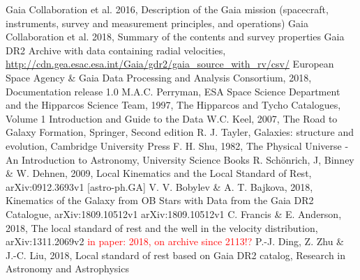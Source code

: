 \documentclass{aastex62}
\begin{document}
	\begin{thebibliography}{}
		
		 Gaia Collaboration et al. 2016, Description of the Gaia mission (spacecraft, instruments, survey and measurement principles, and operations)
		Gaia Collaboration et al. 2018, Summary of the contents and survey properties
		 Gaia DR2 Archive with data containing radial velocities, \url{http://cdn.gea.esac.esa.int/Gaia/gdr2/gaia_source_with_rv/csv/}
		 European Space Agency \& Gaia Data Processing and Analysis Consortium, 2018, Documentation release 1.0
		 M.A.C. Perryman, ESA Space Science Department and the Hipparcos Science Team, 1997, The Hipparcos and Tycho Catalogues, Volume 1 Introduction and Guide to the Data
		W.C. Keel, 2007, The Road to Galaxy Formation, Springer, Second edition
		 R. J. Tayler, Galaxies: structure and evolution, Cambridge University Press
		 F. H. Shu, 1982, The Physical Universe - An Introduction to Astronomy, University Science Books
		 R. Sch\"{o}nrich, J, Binney \& W. Dehnen, 2009, Local Kinematics and the Local Standard of Rest, arXiv:0912.3693v1 [astro-ph.GA]
		 V. V. Bobylev \& A. T. Bajkova, 2018, Kinematics of the Galaxy from OB Stars with Data from the Gaia DR2 Catalogue, arXiv:1809.10512v1 arXiv:1809.10512v1
		 C. Francis \& E. Anderson, 2018, The local standard of rest and the well in the velocity distribution, arXiv:1311.2069v2 \textcolor{red}{in paper: 2018, on archive since 2113!?}
		 P.-J. Ding, Z. Zhu \& J.-C. Liu, 2018, Local standard of rest based on Gaia DR2 catalog, Research in Astronomy and Astrophysics
		
	\end{thebibliography}
	
\end{document}
